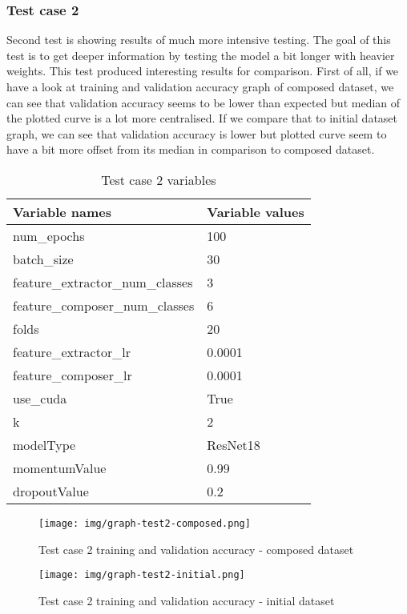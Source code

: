 \subsubsection{Test case 2}
Second test is showing results of much more intensive testing. The goal of this test is to get deeper information by testing the model a bit longer with heavier weights.
\newline
This test produced interesting results for comparison. First of all, if we have a look at training and validation accuracy graph of composed dataset, we can see that validation accuracy seems to be lower than expected but median of the plotted curve is a lot more centralised. If we compare that to initial dataset graph, we can see that validation accuracy is lower but plotted curve seem to have a bit more offset from its median in comparison to composed dataset.
\begin{table}[!ht]
  \centering
    \begin{tabular}{ |m{15em}|m{17em}| } 
     \hline
        Variable names & Variable values \\ 
     \hline
        num{\_}epochs & 100 \\ 
     \hline
        batch{\_}size & 30 \\
     \hline
        feature{\_}extractor{\_}num{\_}classes & 3 \\
     \hline
        feature{\_}composer{\_}num{\_}classes & 6 \\
     \hline
        folds & 20 \\
     \hline
        feature{\_}extractor{\_}lr & 0.0001 \\
     \hline
        feature{\_}composer{\_}lr & 0.0001 \\
     \hline
        use{\_}cuda & True \\
     \hline
        k & 2 \\
     \hline
        modelType & ResNet18 \\
     \hline
        momentumValue & 0.99 \\
     \hline
        dropoutValue & 0.2 \\
     \hline
    \end{tabular}
\caption{Test case 2 variables}
\end{table}

\begin{figure}[H]
    \centerline{\texttt{[image: img/graph-test2-composed.png]}}
    \caption{Test case 2 training and validation accuracy - composed dataset}
\end{figure}
\begin{figure}[H]
    \centerline{\texttt{[image: img/graph-test2-initial.png]}}
    \caption{Test case 2 training and validation accuracy - initial dataset}
\end{figure}

